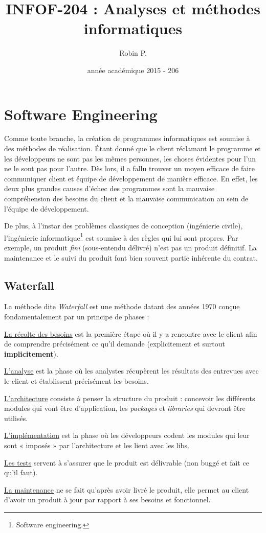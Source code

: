 \documentclass{article}
\title{INFOF-204 : Analyses et méthodes informatiques}
\author{Robin P.}
\date{année académique 2015 - 206}
\begin{document}
\maketitle
\tableofcontents
\newpage
{}

\section{Software Engineering}
	Comme toute branche, la création de programmes informatiques est soumise à des méthodes de réalisation. Étant donné que le client réclamant le programme et les développeurs
	ne sont pas les mêmes personnes, les choses évidentes pour l'un ne le sont pas pour l'autre. Dès lors, il a fallu trouver un moyen efficace de faire communiquer client et équipe
	de développement de manière efficace. En effet, les deux plus grandes causes d'échec des programmes sont la mauvaise compréhension des besoins du client et la mauvaise
	communication au sein de l'équipe de développement.

	De plus, à l'instar des problèmes classiques de conception (ingénierie civile), l'ingénierie informatique\footnote{Software engineering.} est soumise à des règles qui lui sont
	propres. Par exemple, un produit \textit{fini} (sous-entendu délivré) n'est pas un produit définitif. La maintenance et le suivi du produit font bien souvent partie
	inhérente du contrat.

	\subsection{Waterfall}
		La méthode dite \textit{Waterfall} est une méthode datant des années 1970 conçue fondamentalement par un principe de phases :

		\begin{description}
			\item{\underline{La récolte des besoins}} est la première étape où il y a rencontre avec le client afin de comprendre précisément ce qu'il demande
				(explicitement et surtout \textbf{implicitement}).
			\item{\underline{L'analyse}} est la phase où les analystes récupèrent les résultats des entrevues avec le client et établissent précisément les besoins.
			\item{\underline{L'architecture}} consiste à penser la structure du produit : concevoir les différents modules qui vont être d'application, les \textit{packages} et
				\textit{libraries} qui devront être utilisés.
			\item{\underline{L'implémentation}} est la phase où les développeurs codent les modules qui leur sont « imposés » par l'architecture et les lient avec les libs.
			\item{\underline{Les tests}} servent à s'assurer que le produit est délivrable (non buggé et fait ce qu'il faut).
			\item{\underline{La maintenance}} ne se fait qu'après avoir livré le produit, elle permet au client d'avoir un produit à jour par rapport à ses besoins et fonctionnel.
		\end{description}
\end{document}
